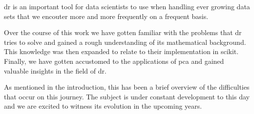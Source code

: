 \acrlong{dr} is an important tool for data scientists to use when handling ever growing data sets that we encouter more and more frequently on a frequent basis.
\bigskip


Over the course of this work we have gotten familiar with the problems that \gls{dr} tries to solve and gained a rough understanding of its mathematical background.
This knowledge was then expanded to relate to their implementation in \gls{scikit}.
Finally, we have gotten accustomed to the applications of \gls{pca} and gained valuable insights in the field of \acrlong{dr}.
\bigskip


As mentioned in the introduction, this has been a brief overview of the difficulties that occur on this journey.
The subject is under constant development to this day and we are excited to witness its evolution in the upcoming years.
